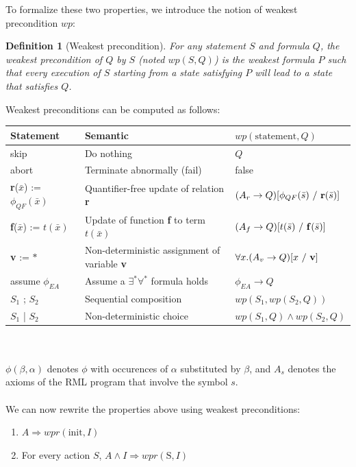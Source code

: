 \documentclass[11pt,a4paper,oldfontcommands,openany]{memoir}
\newtheorem*{definition}{Definition}
\begin{document}
    To formalize these two properties, we introduce the notion of weakest precondition \(wp\):
    \begin{definition}[Weakest precondition]
        For any statement \(S\) and formula \(Q\), the weakest precondition of \(Q\) by \(S\) (noted \(wp(S,Q)\)) is the weakest formula \(P\) such that
        every execution of \(S\) starting from a state satisfying \(P\) will lead to a state that satisfies \(Q\).
    \end{definition}

    Weakest preconditions can be computed as follows:\\

    \begin{tabular}{|l|l|l|}
        \hline
        Statement & Semantic & \( wp(\text{statement},Q) \) \\
        \hline
        skip & Do nothing & \(Q\) \\
        abort & Terminate abnormally (fail) & false \\
        \textbf{r}(\(\bar{x}\)) := \( \phi_{QF}(\bar{x}) \) & Quantifier-free update of relation \textbf{r} & \((A_r \rightarrow Q) [\phi_{QF}(\bar{s})\ /\ \text{\textbf{r}}(\bar{s})]\) \\
        \textbf{f}(\(\bar{x}\)) := \( t(\bar{x}) \) & Update of function \textbf{f} to term \( t(\bar{x}) \) & \((A_f \rightarrow Q) [t(\bar{s})\ /\ \text{\textbf{f}}(\bar{s})]\) \\
        \textbf{v} := \( * \) & Non-deterministic assignment of variable \textbf{v} & \(\forall x. (A_v \rightarrow Q) [x\ /\ \text{\textbf{v}}]\)\\
        assume \( \phi_{EA} \) & Assume a \( \exists^*\forall^* \) formula holds & \( \phi_{EA} \rightarrow Q \) \\
        \( S_1 \) ; \( S_2 \) & Sequential composition & \( wp(S_1, wp(S_2, Q)) \) \\
        \( S_1 \) | \( S_2 \) & Non-deterministic choice & \( wp(S_1, Q) \land wp(S_2, Q) \) \\
        \hline
    \end{tabular}\\ \\
    \( \phi(\beta,\alpha) \) denotes \(\phi\) with occurences of \(\alpha\) substituted by \(\beta\), and \(A_s\) denotes the axioms of the RML program
    that involve the symbol \(s\).\\
    \\
    We can now rewrite the properties above using weakest preconditions:
    \begin{enumerate}
        \item \(A \Rightarrow wpr(\text{init},I)\)
        \item For every action \(S\), \(A \land I \Rightarrow wpr(\text{S},I)\)
    \end{enumerate}
\end{document}
